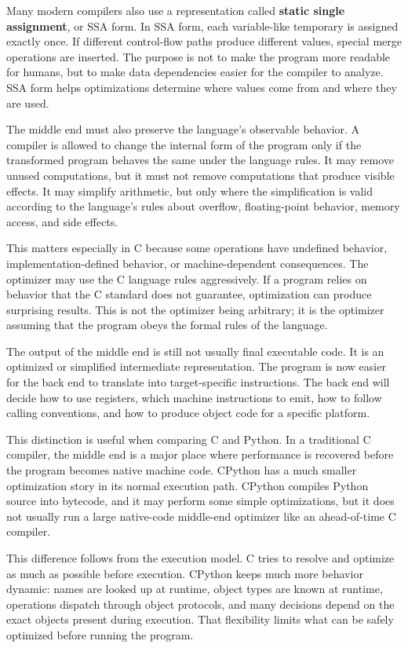 Many modern compilers also use a representation called \textbf{static single assignment}, or SSA form. In SSA form, each variable-like temporary is assigned exactly once. If different control-flow paths produce different values, special merge operations are inserted. The purpose is not to make the program more readable for humans, but to make data dependencies easier for the compiler to analyze. SSA form helps optimizations determine where values come from and where they are used.

The middle end must also preserve the language's observable behavior. A compiler is allowed to change the internal form of the program only if the transformed program behaves the same under the language rules. It may remove unused computations, but it must not remove computations that produce visible effects. It may simplify arithmetic, but only where the simplification is valid according to the language's rules about overflow, floating-point behavior, memory access, and side effects.

This matters especially in C because some operations have undefined behavior, implementation-defined behavior, or machine-dependent consequences. The optimizer may use the C language rules aggressively. If a program relies on behavior that the C standard does not guarantee, optimization can produce surprising results. This is not the optimizer being arbitrary; it is the optimizer assuming that the program obeys the formal rules of the language.

The output of the middle end is still not usually final executable code. It is an optimized or simplified intermediate representation. The program is now easier for the back end to translate into target-specific instructions. The back end will decide how to use registers, which machine instructions to emit, how to follow calling conventions, and how to produce object code for a specific platform.

This distinction is useful when comparing C and Python. In a traditional C compiler, the middle end is a major place where performance is recovered before the program becomes native machine code. CPython has a much smaller optimization story in its normal execution path. CPython compiles Python source into bytecode, and it may perform some simple optimizations, but it does not usually run a large native-code middle-end optimizer like an ahead-of-time C compiler.

This difference follows from the execution model. C tries to resolve and optimize as much as possible before execution. CPython keeps much more behavior dynamic: names are looked up at runtime, object types are known at runtime, operations dispatch through object protocols, and many decisions depend on the exact objects present during execution. That flexibility limits what can be safely optimized before running the program.

